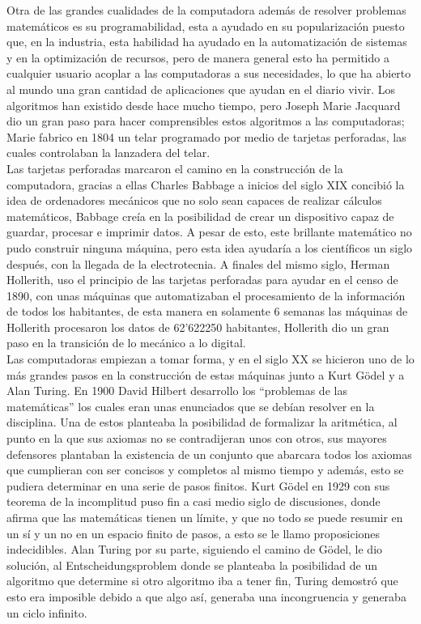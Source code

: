 \documentclass{article}
\begin{document}
Otra de las grandes cualidades de la computadora además de resolver problemas matemáticos es su programabilidad, esta a ayudado en su popularización puesto que, en la industria, esta habilidad ha ayudado en la automatización de sistemas y en la optimización de recursos, pero de manera general esto ha permitido a cualquier usuario acoplar a las computadoras a sus necesidades, lo que ha abierto al mundo una gran cantidad de aplicaciones que ayudan en el diario vivir. Los algoritmos han existido desde hace mucho tiempo, pero Joseph Marie Jacquard dio un gran paso para hacer comprensibles estos algoritmos a las computadoras; \cite{His} Marie fabrico en 1804 un telar programado por medio de tarjetas perforadas, las cuales controlaban la lanzadera del telar. \\

Las tarjetas perforadas marcaron el camino en la construcción de la computadora, gracias a ellas Charles Babbage a inicios del siglo XIX concibió la idea de ordenadores mecánicos que no solo sean capaces de realizar cálculos matemáticos, \cite{His} Babbage creía en la posibilidad de crear un dispositivo capaz de guardar, procesar e imprimir datos. A pesar de esto, este brillante matemático no pudo construir ninguna máquina, pero esta idea ayudaría a los científicos un siglo después, con la llegada de la electrotecnia. A finales del mismo siglo, \cite{His} Herman Hollerith, uso el principio de las tarjetas perforadas para ayudar en el censo de 1890, con unas máquinas que automatizaban el procesamiento de la información de todos los habitantes, de esta manera en solamente 6 semanas las máquinas de Hollerith procesaron los datos de 62’622250 habitantes, Hollerith dio un gran paso en la transición de lo mecánico a lo digital.\\

Las computadoras empiezan a tomar forma, y en el siglo XX se hicieron uno de lo más grandes pasos en la construcción de estas máquinas junto a Kurt Gödel y a Alan Turing. \cite{Jav}En 1900 David Hilbert desarrollo los “problemas de las matemáticas” los cuales eran unas enunciados que se debían resolver en la disciplina. Una de estos planteaba la posibilidad de formalizar la aritmética, al punto en la que sus axiomas no se contradijeran unos con otros, sus mayores defensores plantaban la existencia de un conjunto que abarcara todos los axiomas que cumplieran con ser concisos y completos al mismo tiempo y además, esto se pudiera determinar en una serie de pasos finitos. Kurt Gödel en 1929 con sus teorema de la incomplitud puso fin a casi medio siglo de discusiones, donde afirma que las matemáticas tienen un límite, y que no todo se puede resumir en un sí y un no en un espacio finito de pasos, a esto se le llamo proposiciones indecidibles. Alan Turing por su parte, \cite{Man}siguiendo el camino de Gödel, le dio solución, al Entscheidungsproblem donde se planteaba la posibilidad de un algoritmo que determine si otro algoritmo iba a tener fin, Turing demostró que esto era imposible debido a que algo así, generaba una incongruencia y generaba un ciclo infinito.\\
\end{document}
